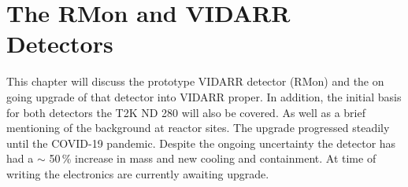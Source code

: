 
\ifpdf
    \graphicspath{{Chapter3/Figs/Raster/}{Chapter3/Figs/PDF/}{Chapter3/Figs/}}
\else
    \graphicspath{{Chapter3/Figs/Vector/}{Chapter3/Figs/}}
\fi


\chapter{The RMon and VIDARR Detectors}\label{Chp:ThePrototypeDetector}
This chapter will discuss the prototype VIDARR detector (RMon) and the on going upgrade of that detector into VIDARR proper. In addition, the initial basis for both detectors the T2K ND 280 will also be covered. As well as a brief mentioning of the background at reactor sites. The upgrade progressed steadily until the COVID-19 pandemic. Despite the ongoing uncertainty the detector has had a $\sim$ 50\,\% increase in mass and new cooling and containment. At time of writing the electronics are currently awaiting upgrade. 

